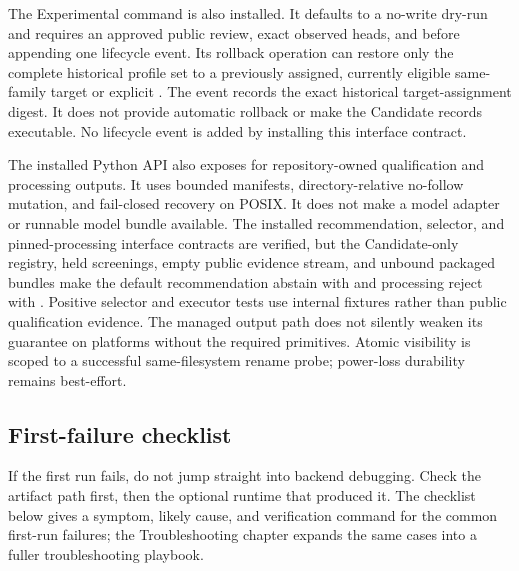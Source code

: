 The Experimental  command is also
installed. It defaults to a no-write dry-run and requires an approved public review,
exact observed heads, and  before appending one lifecycle event.
Its rollback operation can restore only the complete historical profile set to a
previously assigned, currently eligible same-family target or explicit .
The event records the exact historical target-assignment digest.
It does not provide automatic
rollback or make the Candidate records executable. No lifecycle event is added by
installing this interface contract.

The installed Python API also exposes  for
repository-owned qualification and processing outputs. It uses bounded manifests,
directory-relative no-follow mutation, and fail-closed recovery on POSIX. It does
not make a model adapter or runnable model bundle available. The installed
recommendation, selector, and pinned-processing interface contracts are verified,
but the Candidate-only registry, held screenings, empty public evidence stream,
and unbound packaged bundles make the default recommendation abstain with
 and processing
reject with .
Positive selector and executor tests use internal fixtures rather than public
qualification evidence. The managed output path does not silently weaken its guarantee
on platforms without the required primitives. Atomic visibility is scoped to a
successful same-filesystem rename probe; power-loss durability remains best-effort.

\subsection{First-failure checklist}
If the first run fails, do not jump straight into backend debugging. Check the
artifact path first, then the optional runtime that produced it. The checklist
below gives a symptom, likely cause, and verification command for the common
first-run failures; the Troubleshooting chapter expands the same cases into a fuller
troubleshooting playbook.

